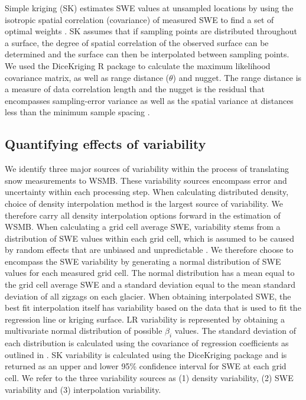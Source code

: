 \documentclass[twocolumn,letterpaper]{igs}
\begin{document}
Simple kriging (SK) estimates SWE values at unsampled locations by using the isotropic spatial correlation (covariance) of measured SWE to find a set of optimal weights \citep{Davis1986, Li2008}. SK assumes that if sampling points are distributed throughout a surface, the degree of spatial correlation of the observed surface can be determined and the surface can then be interpolated between sampling points. We used the DiceKriging R package \citep{Roustant2012} to calculate the maximum likelihood covariance matrix, as well as range distance ($\theta$) and nugget. The range distance is a measure of data correlation length and the nugget is the residual that encompasses sampling-error variance as well as the spatial variance at distances less than the minimum sample spacing \citep{Li2008}. 

\subsection{Quantifying effects of variability}

We identify three major sources of variability within the process of translating snow measurements to WSMB. These variability sources encompass error and uncertainty within each processing step. When calculating distributed density, choice of density interpolation method is the largest source of variability. We therefore carry all density interpolation options forward in the estimation of WSMB. When calculating a grid cell average SWE, variability stems from a distribution of SWE values within each grid cell, which is assumed to be caused by random effects that are unbiased and unpredictable \citep{Watson2006}. We therefore choose to encompass the SWE variability by generating a normal distribution of SWE values for each measured grid cell. The normal distribution has a mean equal to the grid cell average SWE and a standard deviation equal to the mean standard deviation of all zigzags on each glacier. When obtaining interpolated SWE, the best fit interpolation itself has variability based on the data that is used to fit the regression line or kriging surface. LR variability is represented by obtaining a multivariate normal distribution of possible $\beta_i$ values. The standard deviation of each distribution is calculated using the covariance of regression coefficients as outlined in \cite{Bagos2015}. SK variability is calculated using the DiceKriging package and is returned as an upper and lower 95\% confidence interval for SWE at each grid cell. We refer to the three variability sources as (1) density variability, (2) SWE variability and (3) interpolation variability. 
\end{document}
